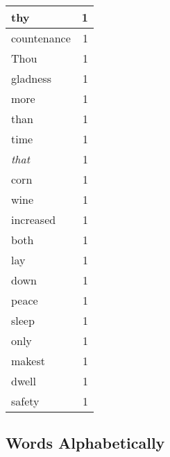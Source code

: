 \begin{center}
\begin{longtable}{l|r}
thy & 1 \\ \hline
countenance & 1 \\ \hline
Thou & 1 \\ \hline
gladness & 1 \\ \hline
more & 1 \\ \hline
than & 1 \\ \hline
time & 1 \\ \hline
\emph{that} & 1 \\ \hline
corn & 1 \\ \hline
wine & 1 \\ \hline
increased & 1 \\ \hline
both & 1 \\ \hline
lay & 1 \\ \hline
down & 1 \\ \hline
peace & 1 \\ \hline
sleep & 1 \\ \hline
only & 1 \\ \hline
makest & 1 \\ \hline
dwell & 1 \\ \hline
safety & 1 \\ \hline
\end{longtable}
\end{center}



\normalsize



\subsection{Words Alphabetically}

